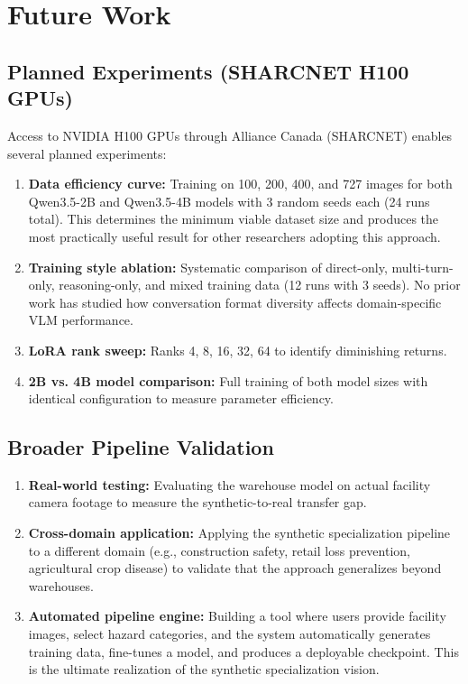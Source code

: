 \documentclass[12pt, a4paper]{article}
\begin{document}
\section{Future Work}

\subsection{Planned Experiments (SHARCNET H100 GPUs)}

Access to NVIDIA H100 GPUs through Alliance Canada (SHARCNET) enables several planned experiments:

\begin{enumerate}
    \item \textbf{Data efficiency curve:} Training on 100, 200, 400, and 727 images for both Qwen3.5-2B and Qwen3.5-4B models with 3 random seeds each (24 runs total). This determines the minimum viable dataset size and produces the most practically useful result for other researchers adopting this approach.
    \item \textbf{Training style ablation:} Systematic comparison of direct-only, multi-turn-only, reasoning-only, and mixed training data (12 runs with 3 seeds). No prior work has studied how conversation format diversity affects domain-specific VLM performance.
    \item \textbf{LoRA rank sweep:} Ranks 4, 8, 16, 32, 64 to identify diminishing returns.
    \item \textbf{2B vs. 4B model comparison:} Full training of both model sizes with identical configuration to measure parameter efficiency.
\end{enumerate}

\subsection{Broader Pipeline Validation}

\begin{enumerate}
    \item \textbf{Real-world testing:} Evaluating the warehouse model on actual facility camera footage to measure the synthetic-to-real transfer gap.
    \item \textbf{Cross-domain application:} Applying the synthetic specialization pipeline to a different domain (e.g., construction safety, retail loss prevention, agricultural crop disease) to validate that the approach generalizes beyond warehouses.
    \item \textbf{Automated pipeline engine:} Building a tool where users provide facility images, select hazard categories, and the system automatically generates training data, fine-tunes a model, and produces a deployable checkpoint. This is the ultimate realization of the synthetic specialization vision.
\end{enumerate}
\end{document}
